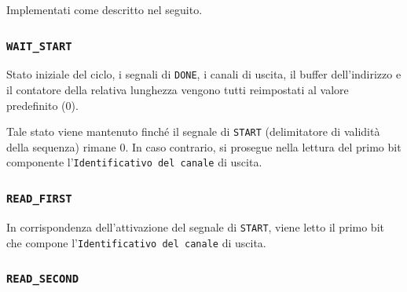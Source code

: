 \documentclass[a4paper,11pt]{article} %
\begin{document}
    \scalebox{0.9}
    {
    }

    \medskip

    Implementati come descritto nel seguito.

    \subsubsection{\texttt{WAIT\_START}}

    Stato iniziale del ciclo, i segnali di \texttt{DONE}, i canali di uscita, il buffer dell'indirizzo e il contatore della relativa lunghezza vengono tutti reimpostati
    al valore predefinito ($0$).

    Tale stato viene mantenuto finché il segnale di \texttt{START} (delimitatore di validità della sequenza) rimane $0$.
    In caso contrario, si prosegue nella lettura del primo bit componente l'\texttt{Identificativo del canale} di uscita.

    \subsubsection{\texttt{READ\_FIRST}}

    In corrispondenza dell'attivazione del segnale di \texttt{START}, viene letto il primo bit che compone l'\texttt{Identificativo del canale} di uscita.

    \subsubsection{\texttt{READ\_SECOND}}
\end{document}
